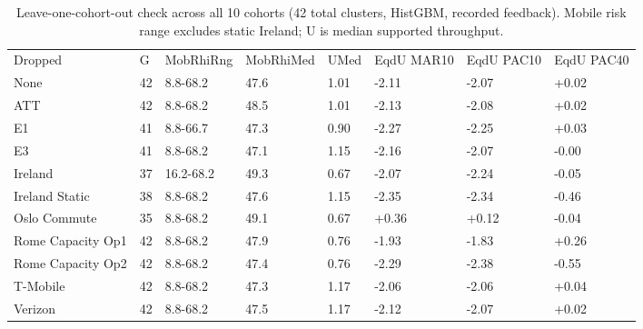 \begin{table}[!ht]
\centering\footnotesize\setlength{\tabcolsep}{3.5pt}
\caption{Leave-one-cohort-out check across all 10 cohorts (42 total clusters, HistGBM, recorded feedback). Mobile risk range excludes static Ireland; U is median supported throughput.}
\begin{tabular}{llllllll}
\hline
Dropped & G & MobRhiRng & MobRhiMed & UMed & EqdU MAR10 & EqdU PAC10 & EqdU PAC40 \\
None & 42 & 8.8-68.2 & 47.6 & 1.01 & -2.11 & -2.07 & +0.02 \\
ATT & 42 & 8.8-68.2 & 48.5 & 1.01 & -2.13 & -2.08 & +0.02 \\
E1 & 41 & 8.8-66.7 & 47.3 & 0.90 & -2.27 & -2.25 & +0.03 \\
E3 & 41 & 8.8-68.2 & 47.1 & 1.15 & -2.16 & -2.07 & -0.00 \\
Ireland & 37 & 16.2-68.2 & 49.3 & 0.67 & -2.07 & -2.24 & -0.05 \\
Ireland Static & 38 & 8.8-68.2 & 47.6 & 1.15 & -2.35 & -2.34 & -0.46 \\
Oslo Commute & 35 & 8.8-68.2 & 49.1 & 0.67 & +0.36 & +0.12 & -0.04 \\
Rome Capacity Op1 & 42 & 8.8-68.2 & 47.9 & 0.76 & -1.93 & -1.83 & +0.26 \\
Rome Capacity Op2 & 42 & 8.8-68.2 & 47.4 & 0.76 & -2.29 & -2.38 & -0.55 \\
T-Mobile & 42 & 8.8-68.2 & 47.3 & 1.17 & -2.06 & -2.06 & +0.04 \\
Verizon & 42 & 8.8-68.2 & 47.5 & 1.17 & -2.12 & -2.07 & +0.02 \\
\hline
\end{tabular}
\end{table}
